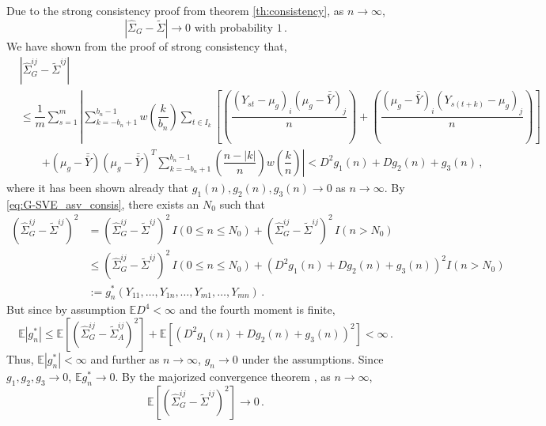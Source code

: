 \documentclass[11pt]{article}
\newcommand{\E}{\mathbb{E}}
\theoremstyle{remark}
\begin{document}
 Due to the strong consistency proof from theorem \ref{th:consistency}, as $n \to \infty$,
\begin{equation}
\label{eq:G-SVE_asv_consis}
 \left|\hat{\Sigma}_{G} -  \tilde{\Sigma}\right| \to 0 \text{ with probability 1}\,. 
\end{equation}
We have shown from the proof of strong consistency that,
\begin{align*}
 &\left| \hat{\Sigma}_{G}^{ij} - \tilde{\Sigma}^{ij} \right|\\
 & \leq \dfrac{1}{m} \sum_{s=1}^m \left| \sum_{k=-b_n+1}^{b_n-1} w \left(\dfrac{k}{b_n} \right) \sum_{t \in I_k}   \left[ \left( \dfrac{(Y_{st} - \mu_g)_i(\mu_g-\bar{\bar{Y}})_j}{n}\right)+ \left(\dfrac{(\mu_g-\bar{\bar{Y}})_i(Y_{s(t+k)}-\mu_g)_j}{n}\right) \right] \right.\\
& \quad \quad  \left. + (\mu_g-\bar{\bar{Y}})(\mu_g-\bar{\bar{Y}})^T\sum_{k=-b_n+1}^{b_n-1}\left(\dfrac{n-|k|}{n}\right)w\left(\dfrac{k}{n}\right) \right|  < D^2g_1(n) + Dg_2(n) + g_3(n)\,,
\end{align*}
where it has been shown already that $g_1(n), g_2(n), g_3(n) \to 0$ as $n \to \infty$. By \eqref{eq:G-SVE_asv_consis}, there exists an $N_0$ such that
\begin{align*}
\left(\hat{\Sigma}_{G}^{ij} - \tilde{\Sigma}^{ij} \right)^2 &= \left(\hat{\Sigma}_{G}^{ij} - \tilde{\Sigma}^{ij} \right)^2 \, I(0 \leq n \leq N_0) + \left(\hat{\Sigma}_{G}^{ij} - \tilde{\Sigma}^{ij} \right)^2 \, I(n > N_0)\\
& \leq \left(\hat{\Sigma}_{G}^{ij} - \tilde{\Sigma}^{ij} \right)^2 \, I(0 \leq n \leq N_0) +  \left(D^2g_1(n) + Dg_2(n) + g_3(n) \right)^2 I(n > N_0)\\
& := g_n^*(Y_{11}, \dots, Y_{1n}, \dots, Y_{m1}, \dots, Y_{mn})\,.
\end{align*}
But since by assumption $\E D^4 <\infty$ and the fourth moment is finite,
\[
\E \left| g_n^* \right| \leq  \E \left[\left(\hat{\Sigma}_{G}^{ij} - \tilde{\Sigma}_{A}^{ij} \right)^2 \right] + \E \left[\left(D^2g_1(n) + Dg_2(n) + g_3(n) \right)^2 \right] < \infty\,.
\]
Thus, $\E \left| g_n^* \right| < \infty$ and further as $n \to \infty$, $g_n \to 0$ under the assumptions. Since $g_1, g_2, g_3 \to 0$, $\E g_n^* \to 0$. By the majorized convergence theorem \citep{zeid:2013}, as $n \to \infty$,
\begin{equation}
\label{eq:squared_mean_diff}
  \E \left[\left(\hat{\Sigma}_{G}^{ij} - \tilde{\Sigma}^{ij} \right)^2 \right] \to 0\,.
\end{equation}
\end{document}
